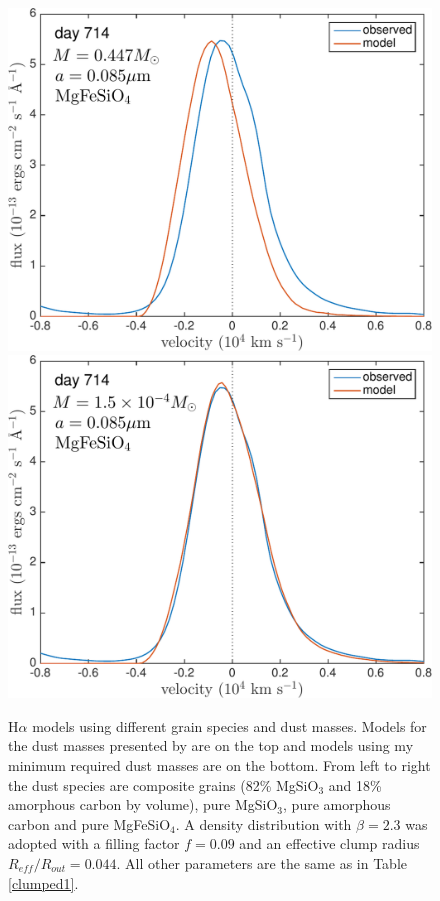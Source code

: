 \begin{figure}
\includegraphics[trim =0 0 0 0,clip=true,scale=0.35]{chapters/chapter5/images/silicates_take2/MgFeSiO4_Dwek_Ha.pdf}
\hspace{3mm}
\includegraphics[trim =0 0 0 -10,clip=true,scale=0.35]{chapters/chapter5/images/silicates_take2/MgFeSiO4_bestfit_Ha.pdf}
\caption{H$\alpha$ models using different grain species and dust masses.   
Models for the dust masses presented by \citet{Dwek2015} are on the top and models 
using my minimum required dust masses are on the bottom.  From left to 
right the dust species are composite grains (82\% MgSiO$_3$ and 18\% 
amorphous carbon by volume), pure MgSiO$_3$, pure amorphous carbon and pure 
MgFeSiO$_4$. A density distribution with $\beta=2.3$ was adopted with a 
filling factor $f=0.09$ and an effective clump radius 
$R_{eff}/R_{out}=0.044$.  All other parameters are the same as in Table 
\ref{clumped1}.}
\label{Dwek_models_Ha}
\end{figure}


